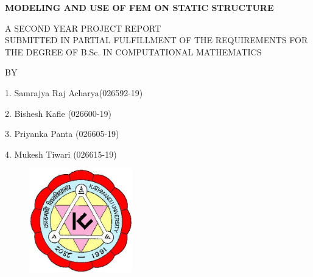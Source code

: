 \documentclass[a4paper,12pt]{report}    %
\begin{document}



{\large
\begin{center}
{{\bf{\color{red}MODELING AND USE OF FEM ON STATIC STRUCTURE}}}\\
\end{center}


\vspace{0.8cm}

{\normalsize
\begin{center}
A SECOND YEAR PROJECT REPORT\\

\vspace{0.5cm}
SUBMITTED IN PARTIAL FULFILLMENT OF THE REQUIREMENTS FOR\\
THE DEGREE OF B.Sc. IN COMPUTATIONAL MATHEMATICS\\

\vspace{1.0cm}

BY
\end{center}
\begin{center}
\begin{itemize}
\begin{center}
\item[1.] Samrajya Raj Acharya(026592-19)
\item[2.] Bishesh Kafle (026600-19)
\item[3.] Priyanka Panta (026605-19)
\item[4.] Mukesh Tiwari (026615-19)
\end{center}
\end{itemize}

\end{center}


\vspace{1.0cm}

\begin{figure}[h]
\centering
\includegraphics[height=4.5cm,width=4.5cm]{photos/kulogo.jpg}
\end{figure}


}}
\end{document}
